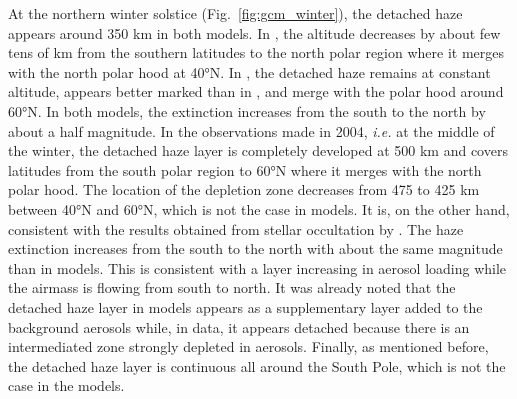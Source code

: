 At the northern winter solstice (Fig.~\ref{fig:gcm_winter}), the detached haze appears around 350 km
in both models. In \cite{Lebonnois2012}, the altitude decreases by about few tens of km from the southern latitudes to
the north polar region where it merges with the north polar hood at \ang{40}N. In \cite{Larson2015}, the detached
haze remains at constant altitude, appears better marked than in \cite{Lebonnois2012}, and merge with the polar hood
around \ang{60}N. In both models, the extinction increases from the south to the north by about a half magnitude.
In the observations made in 2004, \emph{i.e.} at the middle of the winter, the detached haze layer is completely developed at
500 km and covers latitudes from the south polar region to \ang{60}N where it merges with the north polar hood. The
location of the depletion zone decreases from 475 to 425 km between \ang{40}N and \ang{60}N, which is not the case in
models. It is, on the other hand, consistent with the results obtained from stellar occultation by \cite{Sicardy2006}.
The haze extinction increases from the south to the north with about the same magnitude than in models. This
is consistent with a layer increasing in aerosol loading while the airmass is flowing from south to north. It was already
noted \citep{West2011, West2018} that the detached haze layer in models appears as a supplementary layer added to
the background aerosols while, in data, it appears detached because there is an intermediated zone strongly depleted in
aerosols. Finally, as mentioned before, the detached haze layer is continuous all around the South Pole, which is not
the case in the models.

